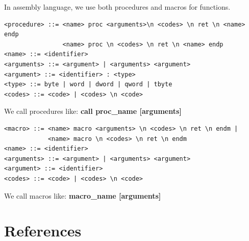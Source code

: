 \documentclass[11pt]{article}
\begin{document}
In assembly language, we use both procedures and macros for functions. 
\newline
{}
\begin{lstlisting}
<procedure> ::= <name> proc <arguments>\n <codes> \n ret \n <name> endp
				<name> proc \n <codes> \n ret \n <name> endp
<name> ::= <identifier>
<arguments> ::= <argument> | <arguments> <argument>
<argument> ::= <identifier> : <type>
<type> ::= byte | word | dword | qword | tbyte
<codes> ::= <code> | <codes> \n <code>
\end{lstlisting}
We call procedures like:	 {\bf call proc\_name [arguments] }
\newline
{}
\begin{lstlisting}
<macro> ::= <name> macro <arguments> \n <codes> \n ret \n endm |
		    <name> macro \n <codes> \n ret \n endm
<name> ::= <identifier>
<arguments> ::= <argument> | <arguments> <argument>
<argument> ::= <identifier>
<codes> ::= <code> | <codes> \n <code>
\end{lstlisting}
We call macros like:	{\bf macro\_name [arguments] }
\newline
{}

\section{References}
\end{document}
